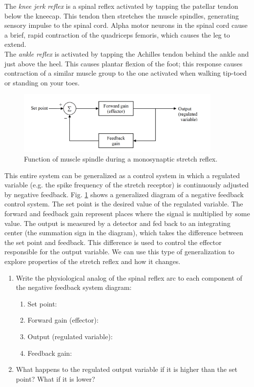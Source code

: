 \documentclass{article}
\begin{document}
The \textit{knee jerk reflex} is a spinal reflex activated by tapping the patellar tendon below the kneecap. This tendon then stretches the muscle spindles, generating sensory impulse to the spinal cord. Alpha motor neurons in the spinal cord cause a brief, rapid contraction of the quadriceps femoris, which causes the leg to extend.\\

The \textit{ankle reflex} is activated by tapping the Achilles tendon behind the ankle and just above the heel. This causes plantar flexion of the foot; this response causes contraction of a similar muscle group to the one activated when walking tip-toed or standing on your toes.\\

\begin{figure}[h]
\centering
\includegraphics[width=0.9\textwidth]{../images/EMG_II_2.png}	
\caption{Function of muscle spindle during a monosynaptic stretch reflex.}
\label{feedback}
\end{figure}

This entire system can be generalized as a control system in which a regulated variable (e.g. the spike frequency of the stretch receptor) is continuously adjusted by negative feedback. Fig. \ref{feedback} shows a generalized diagram of a negative feedback control system. The set point is the desired value of the regulated variable. The forward and feedback gain represent places where the signal is multiplied by some value. The output is measured by a detector and fed back to an integrating center (the summation sign in the diagram), which takes the difference between the set point and feedback. This difference is used to control the effector responsible for the output variable. We can use this type of generalization to explore properties of the stretch reflex and how it changes.\\

\begin{enumerate}
	\item Write the physiological analog of the spinal reflex arc to each component of the negative feedback system diagram:
	\begin{enumerate}
		\item Set point:
		\item Forward gain (effector):
		\item Output (regulated variable):
		\item Feedback gain:
	\end{enumerate}
	\item What happens to the regulated output variable if it is higher than the set point? What if it is lower?
\end{enumerate}
\end{document}
